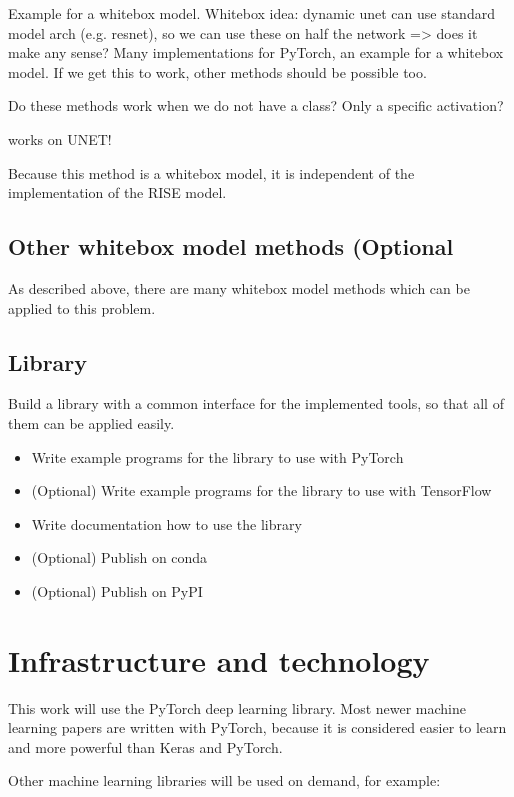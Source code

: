 Example for a whitebox model. Whitebox idea: dynamic unet can use standard model arch (e.g. resnet), so we can use these on half the network => does it make any sense?
Many implementations for PyTorch, an example for a whitebox model. If we get this to work, other methods should be possible too.

Do these methods work when we do not have a class? Only a specific activation?

works on UNET!

Because this method is a whitebox model, it is independent of the implementation of the RISE model.


\subsection{Other whitebox model methods (Optional}
As described above, there are many whitebox model methods which can be applied to this problem.

\subsection{Library}
Build a library with a common interface for the implemented tools, so that all of them can be applied easily.
\begin{itemize}
    \item Write example programs for the library to use with PyTorch
    \item (Optional) Write example programs for the library to use with TensorFlow
    \item Write documentation how to use the library
    \item (Optional) Publish on conda
    \item (Optional) Publish on PyPI
    
\end{itemize}

\section{Infrastructure and technology}
This work will use the PyTorch\cite{paszke2017automatic} deep learning library. Most newer machine learning papers are written with PyTorch, because it is considered easier to learn and more powerful than Keras and PyTorch\cite{pytorchvstensorflow}.

Other machine learning libraries will be used on demand, for example:

